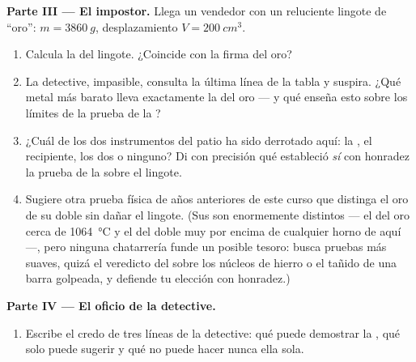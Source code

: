 \begin{problem}
\medskip\noindent\textbf{Parte III --- El impostor.}
Llega un vendedor con un reluciente lingote de ``oro'':
$m = \qty{3860}{g}$, desplazamiento $V = \qty{200}{cm^3}$.
\begin{enumerate}[resume]
  \item Calcula la  del lingote. ¿Coincide con la firma del
        oro?
  \item La detective, impasible, consulta la última línea de la tabla
        y suspira. ¿Qué metal más barato lleva exactamente la
         del oro --- y qué enseña esto sobre los límites
        de la prueba de la ?
  \item ¿Cuál de los dos instrumentos del patio ha sido derrotado
        aquí: la , el recipiente, los dos o ninguno? Di con
        precisión qué estableció \emph{sí} con honradez la prueba de
        la  sobre el lingote.
  \item Sugiere otra prueba física de años anteriores de este curso
        que distinga el oro de su doble sin dañar el lingote. (Sus
         son enormemente distintos --- el del oro
        cerca de \qty{1064}{\celsius} y el del doble muy por encima de
        cualquier horno de aquí ---, pero ninguna chatarrería
        funde un posible tesoro: busca pruebas más suaves, quizá
        el veredicto del  sobre los núcleos de hierro o el
        tañido de una barra golpeada, y defiende tu elección con
        honradez.)
\end{enumerate}

\medskip\noindent\textbf{Parte IV --- El oficio de la detective.}
\begin{enumerate}[resume]
  \item Escribe el credo de tres líneas de la detective: qué puede
        demostrar la , qué solo puede sugerir y qué no
        puede hacer nunca ella sola.
\end{enumerate}
\end{problem}
